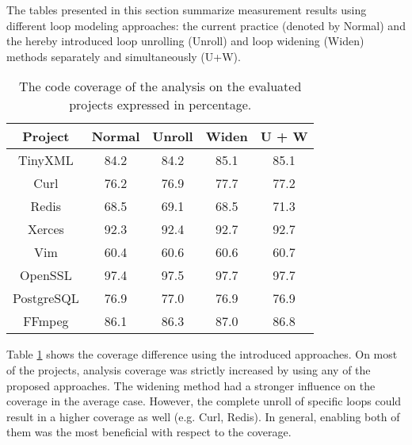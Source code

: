 The tables presented in this section summarize measurement results using 
different loop modeling approaches: the current practice (denoted by Normal)
and the hereby introduced loop unrolling (Unroll) and loop widening (Widen)
methods separately and simultaneously (U+W).

\begin{table}[!htb]
	\centering
\begin{tabular}{ |c||c|c|c|c| } 
	\hline
	Project & Normal & Unroll & Widen & U + W \\
	\hline \hline
	TinyXML & 84.2 & 84.2 & 85.1 & 85.1 \\ 
	\hline
	Curl & 76.2 & 76.9 & 77.7 & 77.2 \\ 
	\hline
	Redis & 68.5 & 69.1 & 68.5 & 71.3 \\ 
	\hline
	Xerces & 92.3 & 92.4 & 92.7 & 92.7 \\ 
	\hline
	Vim & 60.4 & 60.6 &	60.6 & 60.7 \\ 
	\hline
	OpenSSL & 97.4 & 97.5 & 97.7 & 97.7 \\ 
	\hline
	PostgreSQL & 76.9 &	77.0 & 76.9 & 76.9 \\ 
	\hline
	FFmpeg & 86.1 & 86.3 & 87.0 & 86.8 \\	
	\hline
\end{tabular}
\caption{The code coverage of the analysis on the evaluated projects expressed 
in percentage.}\label{tab:cov}
\end{table}

Table \ref{tab:cov} shows the coverage difference using the introduced 
approaches. On most of the projects, analysis coverage was strictly increased by
using any of the proposed approaches. The widening method had a stronger 
influence on the coverage in the average case. However, the complete unroll of 
specific loops could result in a higher coverage as well (e.g. Curl, Redis).
In general, enabling both of them was the most beneficial with respect to the 
coverage.

